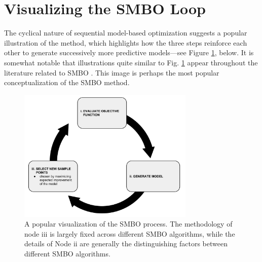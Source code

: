 \section{Visualizing the SMBO Loop}

The cyclical nature of sequential model-based optimization suggests a popular illustration of the method, which highlights how the three steps reinforce each other to generate successively more predictive models---see Figure \ref{fig:smbo_cycle}, below. It is somewhat notable that illustrations quite similar to Fig. \ref{fig:smbo_cycle} appear throughout the literature related to SMBO \cite{hutter_sequential_2011,protolife_pdt_2013}. This image is perhaps the most popular conceptualization of the SMBO method.

\begin{figure}[h]
	\centering
	\includegraphics[width=0.75\textwidth]{images/smbo_loop}
	\caption{A popular visualization of the SMBO process. The methodology of node iii is largely fixed across different SMBO algorithms, while the details of Node ii are generally the distinguishing factors between different SMBO algorithms.}
	\label{fig:smbo_cycle}

\end{figure}



